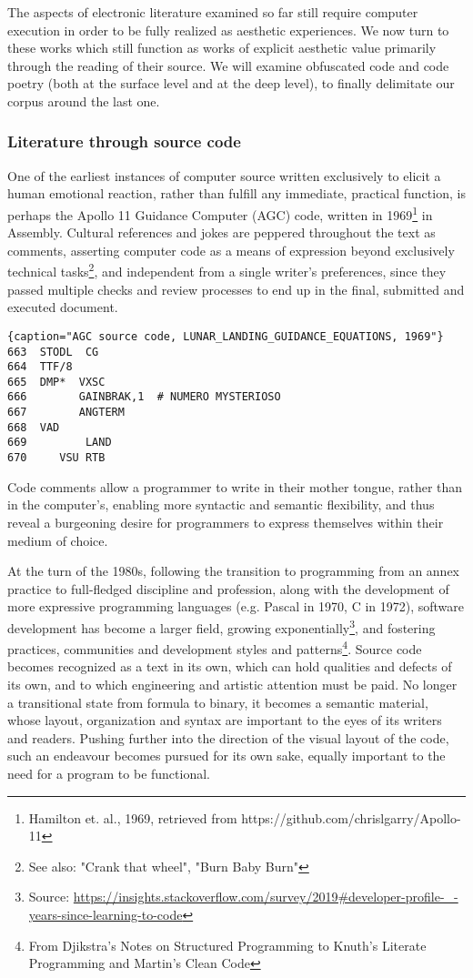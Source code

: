 \documentclass{article}
\begin{document}
The aspects of electronic literature examined so far still require computer execution in order to be fully realized as aesthetic experiences. We now turn to these works which still function as works of explicit aesthetic value primarily through the reading of their source. We will examine obfuscated code and code poetry (both at the surface level and at the deep level), to finally delimitate our corpus around the last one.

\subsubsection{Literature through source code}

One of the earliest instances of computer source written exclusively to elicit a human emotional reaction, rather than fulfill any immediate, practical function, is perhaps the Apollo 11 Guidance Computer (AGC) code, written in 1969\footnote{Hamilton et. al., 1969, retrieved from https://github.com/chrislgarry/Apollo-11} in Assembly. Cultural references and jokes are peppered throughout the text as comments, asserting computer code as a means of expression beyond exclusively technical tasks\footnote{See also: "Crank that wheel", "Burn Baby Burn"}, and independent from a single writer's preferences, since they passed multiple checks and review processes to end up in the final, submitted and executed document.

\begin{lstlisting}{caption="AGC source code, LUNAR_LANDING_GUIDANCE_EQUATIONS, 1969"}
663  STODL  CG
664	 TTF/8
665  DMP*  VXSC
666	       GAINBRAK,1  # NUMERO MYSTERIOSO
667        ANGTERM
668	 VAD
669		    LAND
670     VSU	RTB
\end{lstlisting}

Code comments allow a programmer to write in their mother tongue, rather than in the computer's, enabling more syntactic and semantic flexibility, and thus reveal a burgeoning desire for programmers to express themselves within their medium of choice.

At the turn of the 1980s, following the transition to programming from an annex practice to full-fledged discipline and profession, along with the development of more expressive programming languages (e.g. Pascal in 1970, C in 1972), software development has become a larger field, growing exponentially\footnote{Source: \url{https://insights.stackoverflow.com/survey/2019#developer-profile-_-years-since-learning-to-code}}, and fostering practices, communities and development styles and patterns\footnote{From Djikstra's Notes on Structured Programming to Knuth's Literate Programming and Martin's Clean Code}. Source code becomes recognized as a text in its own, which can hold qualities and defects of its own, and to which engineering and artistic attention must be paid. No longer a transitional state from formula to binary, it becomes a semantic material, whose layout, organization and syntax are important to the eyes of its writers and readers. Pushing further into the direction of the visual layout of the code, such an endeavour becomes pursued for its own sake, equally important to the need for a program to be functional.
\end{document}
